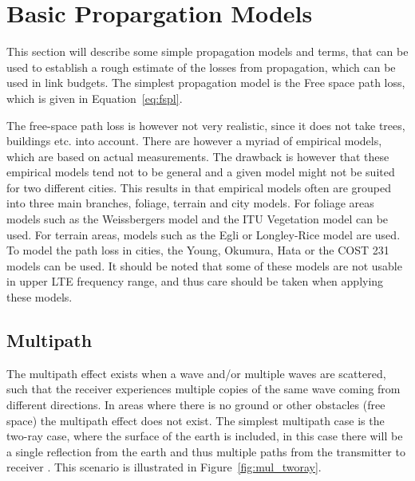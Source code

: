 \section{Basic Propargation Models}
This section will describe some simple propagation models and terms, that can be used to establish a rough estimate of the losses from propagation, which can be used in link budgets. The simplest propagation model is the Free space path loss, which is given in Equation~\ref{eq:fspl}.

The free-space path loss is however not very realistic, since it does not take trees, buildings etc. into account\cite{balanis2012antenna}. There are however a myriad of empirical models, which are based on actual measurements. The drawback is however that these empirical models tend not to be general and a given model might not be suited for two different cities. This results in that empirical models often are grouped into three main branches, foliage, terrain and city models\cite{goldsmith2005wireless}. For foliage areas models such as the Weissbergers model and the ITU Vegetation model can be used\cite{goldsmith2005wireless}. For terrain areas, models such as the Egli or Longley-Rice model are used\cite{goldsmith2005wireless}. To model the path loss in cities, the Young, Okumura, Hata or the COST 231 models can be used\cite{goldsmith2005wireless}. It should be noted that some of these models are not usable in upper LTE frequency range, and thus care should be taken when applying these models. 


\subsection{Multipath}
The multipath effect exists when a wave and/or multiple waves are scattered, such that the receiver experiences multiple copies of the same wave coming from different directions. In areas where there is no ground or other obstacles (free space) the multipath effect does not exist. The simplest multipath case is the two-ray case, where the surface of the earth is included, in this case there will be a single reflection from the earth and thus multiple paths from the transmitter to receiver \cite{}. This scenario is illustrated in Figure~\ref{fig:mul_tworay}.
 
